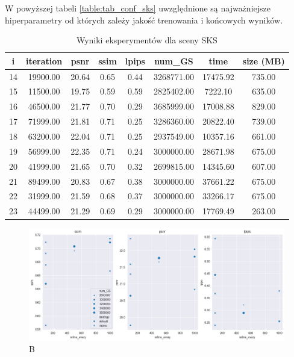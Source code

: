 W powyższej tabeli \ref{table:tab_conf_sks} uwzględnione są najważniejsze hiperparametry od których zależy jakość trenowania i końcowych wyników. 

\begin{table}[h]
    \centering
    \begin{tabular}{|c|c|c|c|c|c|c|c|}
    \hline
    i & iteration & psnr & ssim & lpips & num\_GS & time & size (MB) \\
    \hline
    14 & 19900.00 & 20.64 & 0.65 & 0.44 & 3268771.00 & 17475.92 & 735.00 \\
    \hline
    15 & 11500.00 & 19.75 & 0.59 & 0.59 & 2825402.00 & 7222.10 & 635.00 \\
    \hline
    16 & 46500.00 & 21.77 & 0.70 & 0.29 & 3685999.00 & 17008.88 & 829.00 \\
    \hline
    17 & 71999.00 & 21.81 & 0.71 & 0.25 & 3286360.00 & 20822.40 & 739.00 \\
    \hline
    18 & 63200.00 & 22.04 & 0.71 & 0.25 & 2937549.00 & 10357.16 & 661.00 \\
    \hline
    19 & 56999.00 & 22.35 & 0.71 & 0.24 & 3000000.00 & 28671.98 & 675.00 \\
    \hline
    20 & 41999.00 & 21.65 & 0.70 & 0.32 & 2699815.00 & 14345.60 & 607.00 \\
    \hline
    21 & 89499.00 & 20.83 & 0.67 & 0.38 & 3000000.00 & 37661.22 & 675.00 \\
    \hline
    22 & 31999.00 & 21.59 & 0.68 & 0.37 & 3000000.00 & 33266.17 & 675.00 \\
    \hline
    23 & 44499.00 & 21.29 & 0.69 & 0.29 & 3000000.00 & 17769.49 & 263.00 \\
    \hline
    \end{tabular}
    \caption{Wyniki eksperymentów dla sceny SKS}
    \label{table:tab_res_sks}
\end{table}

\begin{figure}[!h]
    \includegraphics[width=\linewidth]{img/metrics_1.png}
    \caption{B}\label{fig:metrics_1}
\end{figure}

